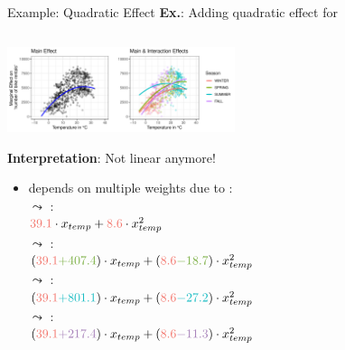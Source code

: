 \documentclass[10pt,compress,t,notes=noshow, xcolor=table]{beamer}
\begin{document}
\begin{frame}{Example: Quadratic Effect}
\textbf{Ex.}: Adding quadratic effect for  
\begin{columns}[T, totalwidth=\textwidth]
\begin{column}{0.7\textwidth}
\includegraphics[width=0.5\textwidth, trim=0cm 0.1cm 10.4cm 0cm, clip]{figure/poly_main_vs_interaction_effects.pdf}

\textbf{Interpretation}: Not linear anymore!
\begin{itemize}
    \item<2>  depends on multiple weights due to :\\
    $\leadsto$ : \\${\color{winter}39.1} \cdot x_{temp} + {\color{winter}8.6} \cdot x_{temp}^2$ \\
    $\leadsto$ :\\ 
    $({\color{winter}39.1} {\color{spring}+407.4}) \cdot x_{temp} + ({\color{winter}8.6} {\color{spring} - 18.7}) \cdot x_{temp}^2$ \\
    $\leadsto$ :\\ $({\color{winter}39.1}  {\color{summer}+801.1}) \cdot x_{temp} + ({\color{winter}8.6} {\color{summer} - 27.2}) \cdot x_{temp}^2$  \\
    $\leadsto$ : \\$({\color{winter}39.1}  {\color{fall}+217.4}) \cdot x_{temp} + ({\color{winter}8.6} {\color{fall} - 11.3}) \cdot x_{temp}^2$ 
\end{itemize}


\end{column}
\end{columns}
\end{frame}
\end{document}
